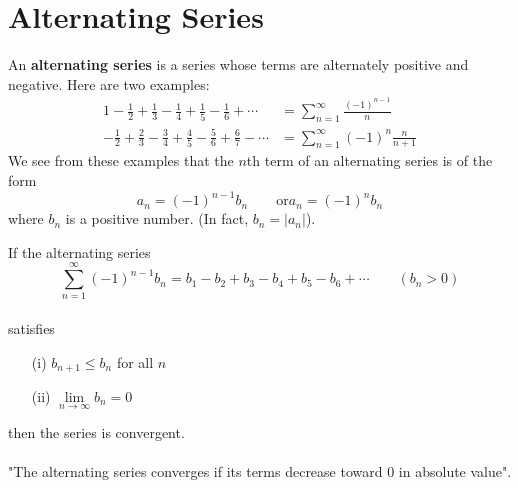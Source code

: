 \section{Alternating Series}
  An \textbf{alternating series} is a series whose terms are alternately positive and negative. Here are two examples:
  \begin{align*}
    1-\frac{1}{2}+\frac{1}{3}-\frac{1}{4}+\frac{1}{5}-\frac{1}{6}+\cdots &= \sum_{n=1}^{\infty} \frac{(-1)^{n-1}}{n} \\
    -\frac{1}{2}+\frac{2}{3}-\frac{3}{4}+\frac{4}{5}-\frac{5}{6}+\frac{6}{7}-\cdots &= \sum_{n=1}^{\infty} (-1)^{n}\frac{n}{n+1}
  \end{align*}
  We see from these examples that the $n$th term of an alternating series is of the form
  $$ a_n = (-1)^{n-1}b_n \qquad\text{or} a_n = (-1)^{n}b_n $$
  where $b_n$ is a positive number. (In fact, $b_n = |a_n|$).
  \begin{definition}
    If the alternating series
    $$ \sum_{n=1}^{\infty} (-1)^{n-1}b_n = b_1 - b_2 + b_3 - b_4 + b_5 - b_6 + \cdots \qquad (b_n >0)$$ \\
    satisfies
    \begin{center}
      \begin{minipage}{.4\textwidth}
        \begin{enumerate}
          \item[(i)] $b_{n+1} \leq b_n$ \quad for all $n$
          \item[(ii)] $\lim\limits_{n\to\infty} b_n = 0$
        \end{enumerate}
      \end{minipage}
    \end{center}
    then the series is convergent.
    \\~\\
    "The alternating series converges if its terms decrease toward 0 in absolute value".
  \end{definition}
